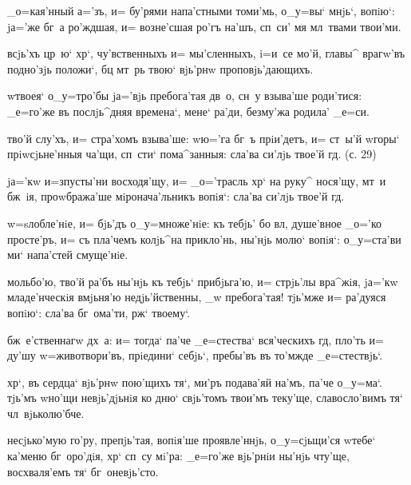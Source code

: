 _о=кая'нный а='зъ, и= бу'рями напа'стными томи'мь, 
о_у=вы` мнjь`, вопiю`: jа='же бг~а ро'ждшая, и= 
возне'сшая ро'гъ на'шъ, сп~си' мя мл~твами твои'ми.

всjь'хъ цр~ю` хр`, чу'вственныхъ и= мы'сленныхъ, 
i=и~се мо'й, главы^ врагw'въ под\ъ но'зjь положи`, бц 
мт~рь твою` вjь'рнw проповjь'дающихъ.

w\т твоея` о_у=тро'бы jа='вjь пребога'тая дв~о, сн~у 
взыва'ше роди'тися: _е=го'же въ послjь^дняя времена`, 
мене` ра'ди, без\ъ му'жа родила' _е=си.


тво'й слу'хъ, и= стра'хомъ взыва'ше: w\т ю='га бг~ъ 
прiи'детъ, и= ст~ы'й w\т горы` прiwсjьне'нныя ча'щи, 
сп~сти` пома^занныя: сла'ва си'лjь твое'й гд. (с. 29)

jа='кw и=з\ъ пусты'ни восходя'щу, и= _о='трасль хр` 
на руку^ нося'щу, мт~и бж~iя, проwбража'ше 
мiронача'льникъ вопiя`: сла'ва си'лjь твое'й гд.

w=sлобле'нiе, и= бjь'дъ о_у=множе'нiе: къ тебjь' бо 
вл, душе'вное _о='ко просте'ръ, и= съ пла'чемъ 
колjь^на прикло'нь, ны'нjь молю` вопiя`: о_у=ста'ви ми` 
напа'стей смуще'нiе.

мольбо'ю, тво'й ра'бъ ны'нjь къ тебjь` прибjьга'ю, и= 
стрjь'лы вра^жiя, jа='кw младе'нческiя вмjьня'ю 
недjь'йственны, _w пребога'тая! тjь'мже и= ра'дуяся 
вопiю`: сла'ва бг~ома'ти, рж` твоему`.

бж~е'ственнагw дх~а: и= тогда` па'че _е=стества` 
вся'ческихъ гд, пло'ть и= ду'шу w=животвори'въ, 
прiедини` себjь`, пребы'въ въ то'мжде _е=стествjь`.


хр`, въ сердца` вjь'рнw пою'щихъ тя`, ми'ръ подава'яй 
на'мъ, па'че о_у=ма`. тjь'мъ w\т но'щи невjь'дjьнiя ко 
дню` свjь'томъ твои'мъ теку'ще, славосло'вимъ тя` 
чл~вjьколю'бче.

несjько'мую го'ру, препjь'тая, вопiя'ше проявле'ннjь, 
о_у=сjьщи'ся w\т тебе` ка'меню бг~оро'дiя, хр` сп~су 
мi'ра: _е=го'же вjь'рнiи ны'нjь чту'ще, восхваля'емъ тя` 
бг~оневjь'сто.

